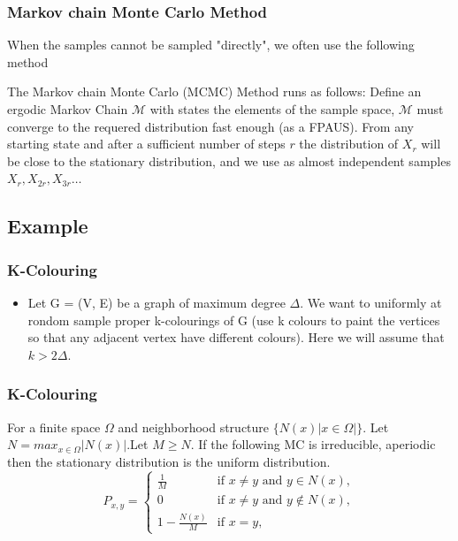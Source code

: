 \documentclass[table, usenames,dvipsnames,svgnames]{beamer}
\begin{document}
\begin{frame}
    \frametitle{Markov chain Monte Carlo Method}
    When the samples cannot be sampled "directly", we often use the following method
    \begin{definition}[MCMC]
        The Markov chain Monte Carlo (MCMC) Method runs as follows: Define an ergodic Markov Chain $\mathcal{M}$ with states the elements of the sample space, $\mathcal{M}$ must converge to the requered distribution fast enough (as a FPAUS). From any starting state and after a sufficient number of steps $r$ the distribution of $X_r$ will be close to the stationary distribution, and we use as almost independent samples $X_r, X_{2r}, X_{3r} \dots$
    \end{definition}
\end{frame}

\subsection{Example}

\begin{frame}
    \frametitle{K-Colouring}
    \pause 
    \begin{itemize}
        \item Let G = (V, E) be a graph of maximum degree $\Delta$. We want to uniformly at rondom sample proper k-colourings of G (use k colours to paint the vertices so that any adjacent vertex have different colours). Here we will assume that $k > 2\Delta$.
    \end{itemize}
\end{frame}

\begin{frame}
    \frametitle{K-Colouring}
    \pause
    \begin{lemma}
        For a finite space $\Omega$ and neighborhood structure $\{N(x) | x \in \Omega|\}$. Let $N = max_{x\in \Omega}|N(x)|$.Let $M \geq N$. If the following MC is irreducible, aperiodic then the stationary distribution is the uniform distribution.
        $$
        P_{x,y} = \begin{cases} \frac{1}{M} &\mbox{if } x \neq y \mbox{ and } y \in N(x), \\
    0 &\mbox{if } x \neq y \mbox{ and } y \not\in N(x), \\
    1 - \frac{N(x)}{M} &\mbox{if } x = y, \end{cases}
        $$
    \end{lemma}
\end{frame}
\end{document}
